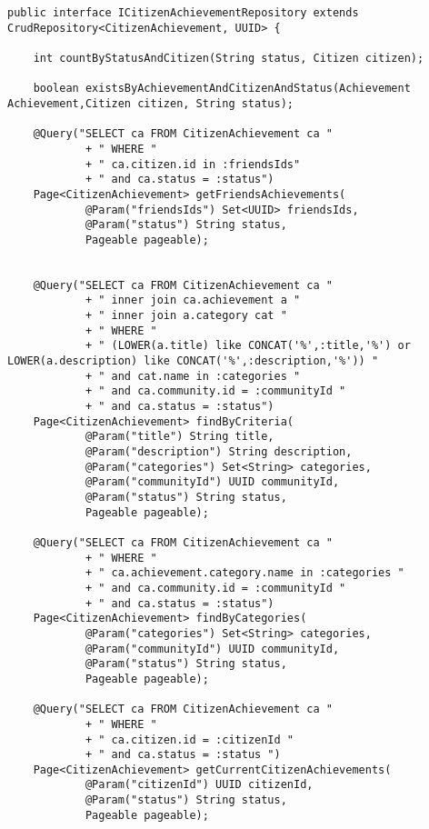 \begin {lstlisting}
public interface ICitizenAchievementRepository extends CrudRepository<CitizenAchievement, UUID> {

	int countByStatusAndCitizen(String status, Citizen citizen);

	boolean existsByAchievementAndCitizenAndStatus(Achievement Achievement,Citizen citizen, String status);

	@Query("SELECT ca FROM CitizenAchievement ca "
			+ " WHERE "
			+ " ca.citizen.id in :friendsIds"
			+ " and ca.status = :status")
	Page<CitizenAchievement> getFriendsAchievements(
			@Param("friendsIds") Set<UUID> friendsIds,
			@Param("status") String status,
			Pageable pageable);
	
	
	@Query("SELECT ca FROM CitizenAchievement ca "
			+ " inner join ca.achievement a "
			+ " inner join a.category cat "
			+ " WHERE "
			+ " (LOWER(a.title) like CONCAT('%
			+ " and cat.name in :categories "
			+ " and ca.community.id = :communityId "
			+ " and ca.status = :status")
	Page<CitizenAchievement> findByCriteria(
			@Param("title") String title, 
			@Param("description") String description,
			@Param("categories") Set<String> categories, 
			@Param("communityId") UUID communityId,
			@Param("status") String status,
			Pageable pageable);
	
	@Query("SELECT ca FROM CitizenAchievement ca "
			+ " WHERE "
			+ " ca.achievement.category.name in :categories "
			+ " and ca.community.id = :communityId "
			+ " and ca.status = :status")
	Page<CitizenAchievement> findByCategories(
			@Param("categories") Set<String> categories,
			@Param("communityId") UUID communityId,
			@Param("status") String status,
			Pageable pageable);
	
	@Query("SELECT ca FROM CitizenAchievement ca "
			+ " WHERE "
			+ " ca.citizen.id = :citizenId "
			+ " and ca.status = :status ")
	Page<CitizenAchievement> getCurrentCitizenAchievements(
			@Param("citizenId") UUID citizenId,
			@Param("status") String status,
			Pageable pageable);
	

\end{lstlisting}

